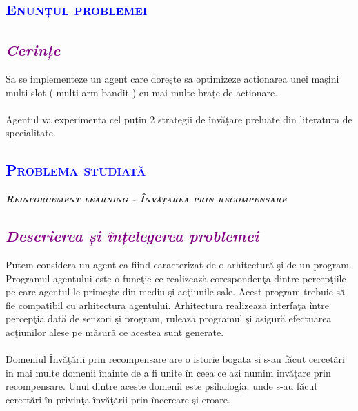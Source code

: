 \documentclass{article}
\begin{document}
\newpage
	\begin{center}
	  \textcolor{blue}{\section{\bfseries\scshape\textcolor{blue}{Enunțul problemei}}}
	\end{center}
 \textcolor{purple}{\subsection{\itshape  \textcolor{purple}{Cerințe}}}
Sa se implementeze un agent care dorește sa optimizeze actionarea unei mașini multi-slot ( multi-arm bandit ) cu mai multe brațe de actionare.\\\\
Agentul va experimenta cel puțin 2 strategii de învățare preluate din literatura de specialitate.
    \begin{center}
	    \textcolor{blue}{\section{\bfseries\scshape\textcolor{blue} {Problema studiată}}}
	\end{center}
    \begin{center}
        \textsc{\Large \textbf{\itshape Reinforcement learning - Învățarea prin recompensare}}
    \end{center}
\textcolor{purple}{\subsection{\itshape \textcolor{purple}{Descrierea și înțelegerea problemei}}}
Putem considera un agent ca fiind caracterizat de o arhitectură şi de un program.
Programul agentului este o funcţie ce realizează corespondenţa dintre percepţiile pe care agentul le primeşte din mediu şi acţiunile sale. Acest program trebuie să fie compatibil cu arhitectura agentului. Arhitectura realizează interfaţa între percepţia dată de senzori şi program, rulează programul şi asigură efectuarea acţiunilor alese pe măsură ce acestea sunt generate.\\\\
Domeniul Învăţării prin recompensare are o istorie bogata si s-au făcut cercetări in mai multe domenii înainte de a fi unite în ceea ce azi numim învăţare prin recompensare. Unul dintre aceste domenii este psihologia; unde s-au făcut cercetări în privinţa învăţării prin încercare şi eroare.\\\\
\end{document}
